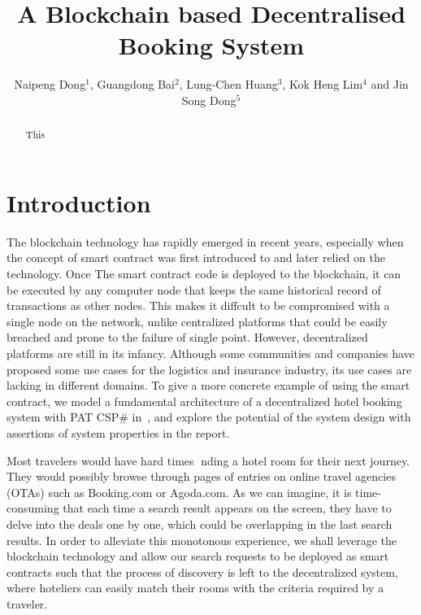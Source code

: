 \documentclass{KERauth}
\begin{document}



\title{A Blockchain based Decentralised Booking System}

\author{Naipeng Dong$^1$, Guangdong Bai$^2$, Lung-Chen Huang$^3$, Kok Heng Lim$^4$ and Jin Song Dong$^{5}$}
\address{$^{1,3,4,5}$School of Computing, National University of Singapore, COM$1$, $13$ Computing Drive, $117417$, Singapore\\ ~$^{2,5}$School of Information and Communication Technology, Griffith University, N$44$ $2.28$, $170$ Kessels Road Nathan, QLD, $4111$, Australia\\
, $^2$}


\begin{abstract}
This 
\end{abstract}

\section{Introduction}
The blockchain technology has rapidly emerged in recent years, especially when the concept of smart contract
was first introduced to and later relied on the technology. Once The smart contract code is deployed to the
blockchain, it can be executed by any computer node that keeps the same historical record of transactions as
other nodes. This makes it diffcult to be compromised with a single node on the network, unlike centralized
platforms that could be easily breached and prone to the failure of single point. However, decentralized
platforms are still in its infancy. Although some communities and companies have proposed some use cases
for the logistics and insurance industry, its use cases are lacking in different domains. To give a more concrete
example of using the smart contract, we model a fundamental architecture of a decentralized hotel booking
system with PAT CSP\# in~\cite{pat}, and explore the potential of the system design with assertions of system
properties in the report.

Most travelers would have hard times nding a hotel room for their next journey. They would possibly
browse through pages of entries on online travel agencies (OTAs) such as Booking.com or Agoda.com. As
we can imagine, it is time-consuming that each time a search result appears on the screen, they have to
delve into the deals one by one, which could be overlapping in the last search results. In order to alleviate
this monotonous experience, we shall leverage the blockchain technology and allow our search requests to
be deployed as smart contracts such that the process of discovery is left to the decentralized system, where
hoteliers can easily match their rooms with the criteria required by a traveler.
\end{document}
